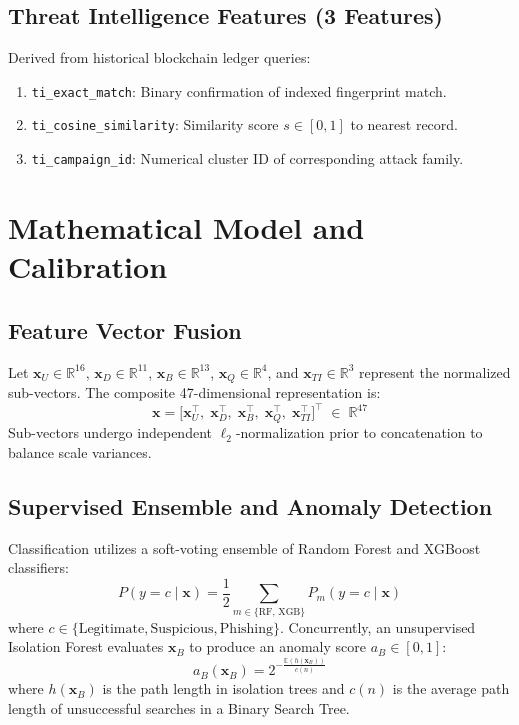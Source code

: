 \documentclass[conference]{IEEEtran}
\begin{document}
\subsection{Threat Intelligence Features (3 Features)}
Derived from historical blockchain ledger queries:
\begin{enumerate}[leftmargin=*,nosep]
\item \texttt{ti\_exact\_match}: Binary confirmation of indexed fingerprint match.
\item \texttt{ti\_cosine\_similarity}: Similarity score $s \in [0, 1]$ to nearest record.
\item \texttt{ti\_campaign\_id}: Numerical cluster ID of corresponding attack family.
\end{enumerate}

\section{Mathematical Model and Calibration}

\subsection{Feature Vector Fusion}
Let $\mathbf{x}_U \in \mathbb{R}^{16}$, $\mathbf{x}_D \in \mathbb{R}^{11}$, $\mathbf{x}_B \in \mathbb{R}^{13}$,
$\mathbf{x}_Q \in \mathbb{R}^{4}$, and $\mathbf{x}_{TI} \in \mathbb{R}^{3}$ represent the normalized sub-vectors.
The composite 47-dimensional representation is:
\begin{equation}
  \mathbf{x} = \bigl[\mathbf{x}_U^\top,\; \mathbf{x}_D^\top,\; \mathbf{x}_B^\top,\;
                     \mathbf{x}_Q^\top,\; \mathbf{x}_{TI}^\top\bigr]^\top \;\in\; \mathbb{R}^{47}
  \label{eq:feat}
\end{equation}
Sub-vectors undergo independent $\ell_2$-normalization prior to concatenation to balance scale variances.

\subsection{Supervised Ensemble and Anomaly Detection}
Classification utilizes a soft-voting ensemble of Random Forest and XGBoost classifiers:
\begin{equation}
  P(y=c \mid \mathbf{x}) = \frac{1}{2}\sum_{m \in \{\text{RF},\,\text{XGB}\}} P_m(y=c \mid \mathbf{x})
  \label{eq:ensemble}
\end{equation}
where $c \in \{\text{Legitimate}, \text{Suspicious}, \text{Phishing}\}$.
Concurrently, an unsupervised Isolation Forest evaluates $\mathbf{x}_B$ to produce an anomaly score
$a_B \in [0, 1]$:
\begin{equation}
  a_B(\mathbf{x}_B) = 2^{-\frac{\mathbb{E}(h(\mathbf{x}_B))}{c(n)}}
  \label{eq:iforest}
\end{equation}
where $h(\mathbf{x}_B)$ is the path length in isolation trees and $c(n)$ is the average path length of
unsuccessful searches in a Binary Search Tree.
\end{document}
